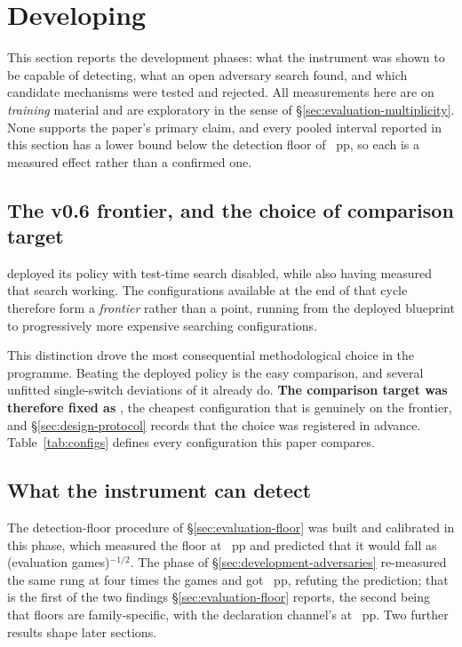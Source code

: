 \section{Developing \sestina{}}
\label{sec:development}

This section reports the development phases: what the instrument was shown to be capable of
detecting, what an open adversary search found, and which candidate mechanisms were tested and
rejected. All measurements here are on \emph{training} material and are exploratory in the sense of
\S\ref{sec:evaluation-multiplicity}. None supports the paper's primary claim, and every pooled
interval reported in this section has a lower bound below the detection floor of
\vsevenPrimaryFloor{}~pp, so each is a measured effect rather than a confirmed one.

\subsection{The v0.6 frontier, and the choice of comparison target}
\label{sec:development-frontier}

\vsix{} deployed its policy with test-time search disabled, while also having measured that search
working. The configurations available at the end of that cycle therefore form a \emph{frontier}
rather than a point, running from the deployed blueprint to progressively more expensive searching
configurations.

This distinction drove the most consequential methodological choice in the programme. Beating the
deployed policy is the easy comparison, and several unfitted single-switch deviations of it already
do. \textbf{The comparison target was therefore fixed as \fcheap{}}, the cheapest configuration that
is genuinely on the frontier, and \S\ref{sec:design-protocol} records that the choice was registered
in advance. Table~\ref{tab:configs} defines every configuration this paper compares.

\subsection{What the instrument can detect}
\label{sec:development-instrument}

The detection-floor procedure of \S\ref{sec:evaluation-floor} was built and calibrated in this
phase, which measured the floor at \vsevenFloorPhaseOne{}~pp and predicted that it would fall as
(evaluation games)$^{-1/2}$. The phase of \S\ref{sec:development-adversaries} re-measured the same
rung at four times the games and got \vsevenPrimaryFloor{}~pp, refuting the prediction; that is the
first of the two findings \S\ref{sec:evaluation-floor} reports, the second being that floors are
family-specific, with the declaration channel's at \vsevenDeclFloor{}~pp. Two further results shape
later sections.

